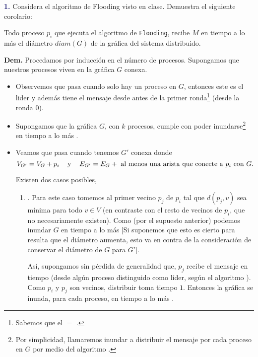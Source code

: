 \newpage
\textbf{\textcolor{MidnightBlue}{1.}}
Considera el algoritmo de Flooding visto en clase.
Demuestra el siguiente corolario:                                                        

Todo proceso $p_i$ que ejecuta el algoritmo de
{\tt Flooding}, recibe $M$ en tiempo a lo más el
diámetro $diam(G)$ de la gráfica del sistema
distribuido.
\newline

\textbf{Dem.} Procedamos por inducción en el número
de procesos. Supongamos que nuestros procesos viven
en la gráfica $G$ conexa.
\begin{itemize}
\item Observemos que pasa cuando solo hay un proceso en $G$,
      entonces este es el lider y además tiene el mensaje
       desde antes de la primer ronda\footnote{Sabemos
      que el  $=$ .} (desde la ronda 0).
\item Supongamos que la gráfica $G$, con $k$ procesos, cumple
      con poder inundarse\footnote{Por simplicidad, llamaremos
      inundar a distribuir el mensaje  por cada proceso
      en $G$ por medio del algoritmo .} en tiempo
      a lo más .
\item Veamos que pasa cuando tenemos $G'$ conexa donde
      \[V_{G'} = V_G + p_i \hspace*{0.3cm} \text{ y } \hspace*{0.3cm}
      E_{G'} = E_G + \text{ al menos una arista que conecte a $p_i$
      con $G$.}\]
      
      Existen dos casos posibles,
      \begin{enumerate}
      \item {}. Para este caso tomemos al primer
      vecino $p_j$ de $p_i$ tal que $d(p_j, v)$ sea mínima para todo
      $v \in V$ (en contraste con el resto de vecinos de $p_i$, que no
      necesariamente existen). Como (por el supuesto anterior) podemos
      inundar $G$ en tiempo a lo más  [Si suponemos
      que esto es cierto para  resulta que el diámetro
      aumenta, esto va en contra de la consideración de conservar el
      diámetro de $G$ para $G'$].

      Así, supongamos sin pérdida de generalidad que, $p_j$ recibe el
      mensaje  en tiempo  (desde algún proceso
      distinguido como líder, según el algoritmo ). Como
      $p_i$ y $p_j$ son vecinos, distribuir  toma tiempo $1$.
      Entonces la gráfica se inunda, para cada proceso, en tiempo a lo más
      .
      

\end{enumerate}
\end{itemize}
